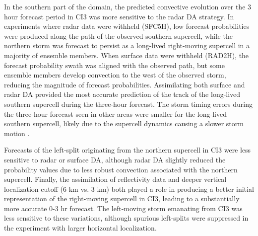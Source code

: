 In the southern part of the domain, the predicted convective evolution over the 3 hour forecast period in CI3 was more sensitive to the radar DA strategy. In experiments where radar data were withheld (SFC5H), low forecast probabilities were produced along the path of the observed southern supercell, while the northern storm was forecast to persist as a long-lived right-moving supercell in a majority of ensemble members. When surface data were withheld (RAD2H), the forecast probability swath was aligned with the observed path, but some ensemble members develop convection to the west of the observed storm, reducing the magnitude of forecast probabilities. Assimilating both surface and radar DA provided the most accurate prediction of the track of the long-lived southern supercell during the three-hour forecast. The storm timing errors during the three-hour forecast seen in other areas were smaller for the long-lived southern supercell, likely due to the supercell dynamics causing a slower storm motion \citep{bunkersetal00}.

Forecasts of the left-split originating from the northern supercell in CI3 were less sensitive to radar or surface DA, although radar DA slightly reduced the probability values due to less robust convection associated with the northern supercell. Finally, the assimilation of reflectivity data and deeper vertical localization cutoff (6 km vs. 3 km) both played a role in producing a better initial representation of the right-moving supercell in CI3, leading to a substantially more accurate 0-3 hr forecast. The left-moving storm emanating from CI3 was less sensitive to these variations, although spurious left-splits were suppressed in the experiment with larger horizontal localization.
